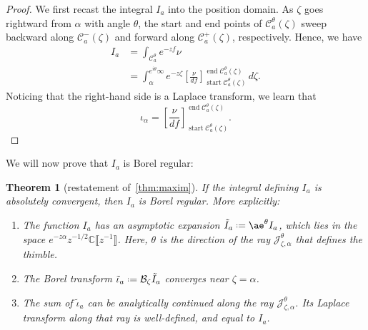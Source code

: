 \documentclass{article}
\newcommand{\C}{\mathbb{C}}
\newcommand{\series}[1]{\tilde{#1}}
\newcommand*{\defeq}{\mathrel{\vcenter{\baselineskip0.5ex \lineskiplimit0pt
                     \hbox{\scriptsize.}\hbox{\scriptsize.}}}%
                     =}
\newcommand{\borel}{\mathcal{B}}
\newcommand{\aexp}{\mathrm{\ae}}
\theoremstyle{definition}
\theoremstyle{plain}
\newtheorem{theorem}{Theorem}[section]
\begin{document}
\begin{proof}
We first recast the integral $I_a$ into the position domain. As $\zeta$ goes rightward from $\alpha$ with angle $\theta$, the start and end points of $\mathcal{C}_a^\theta(\zeta)$ sweep backward along $\mathcal{C}^-_a(\zeta)$ and forward along $\mathcal{C}^+_a(\zeta)$, respectively. Hence, we have
\begin{align*}
I_a & = \int_{\mathcal{C}_a^\theta} e^{-zf} \nu \\
& = \int_{\alpha}^{e^{i\theta} \infty} e^{-z\zeta} \left[\frac{\nu}{df}\right]_{\operatorname{start} \mathcal{C}_a^\theta(\zeta)}^{\operatorname{end} \mathcal{C}_a^\theta(\zeta)}\,d\zeta.
\end{align*}
Noticing that the right-hand side is a Laplace transform, we learn that
\begin{equation}\label{thimble-difference}
{\iota}_\alpha = \left[\frac{\nu}{df}\right]_{\operatorname{start} \mathcal{C}_a^\theta(\zeta)}^{\operatorname{end} \mathcal{C}_a^\theta(\zeta)}.
\end{equation}
\end{proof}
We will now prove that $I_a$ is Borel regular:
\begin{theorem}[restatement of~\ref{thm:maxim}]\label{thm:maxim-proof}
If the integral defining $I_a$ is absolutely convergent, then $I_a$ is Borel regular. More explicitly:
\begin{enumerate}
\item\label{part-1-prf} The function $I_a$ has an asymptotic expansion $\series{I}_a \defeq \aexp^\theta I_a$, which lies in the space $e^{-z \alpha} z^{-1/2} \C\llbracket z^{-1}\rrbracket$. Here, $\theta$ is the direction of the ray $\mathcal{J}^\theta_{\zeta, \alpha}$ that defines the thimble.
\item\label{part-2-prf} The Borel transform $\series{\iota}_a \defeq \borel_\zeta \series{I}_a$ converges near $\zeta = \alpha$.
\item\label{part-3-prf} The sum of $\series{\iota}_a$ can be analytically continued along the ray $\mathcal{J}_{\zeta, \alpha}^\theta$. Its Laplace transform along that ray is well-defined, and equal to $I_a$.
\end{enumerate}
\end{theorem}
\end{document}

